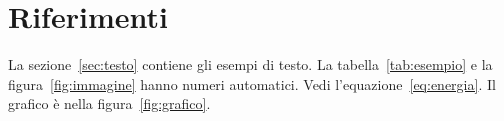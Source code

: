 \documentclass[a4paper,11pt]{article} %
\begin{document}

%

\section{Riferimenti} %
La sezione~\ref{sec:testo} %
contiene gli esempi di testo. %
La tabella~\ref{tab:esempio} %
e la figura~\ref{fig:immagine} %
hanno numeri automatici. %
Vedi l'equazione~\eqref{eq:energia}. %
Il grafico è nella figura~\ref{fig:grafico}. %

\end{document}
